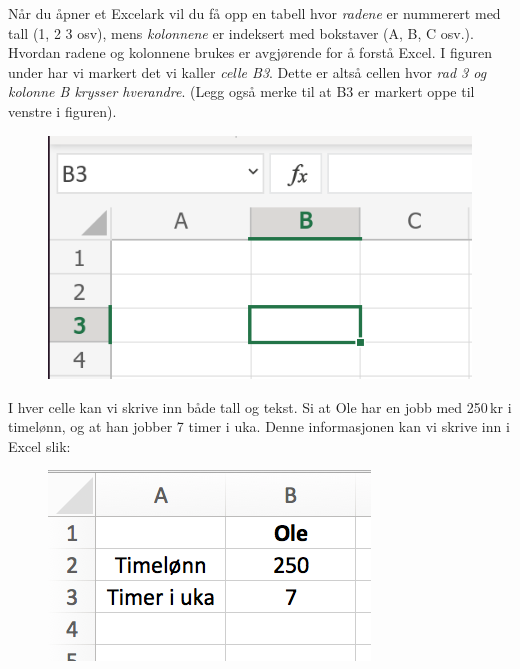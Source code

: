 




Når du åpner et Excelark vil du få opp en tabell hvor \textit{radene} er nummerert med tall (1, 2 3 osv), mens \textit{kolonnene} er indeksert med bokstaver (A, B, C osv.). Hvordan radene og kolonnene brukes er avgjørende for å forstå Excel. I figuren under har vi markert det vi kaller \textit{celle B\textsl{3}}. Dette er altså cellen hvor \textsl{rad 3 og kolonne B krysser hverandre}. (Legg også merke til at B3 er markert oppe til venstre i figuren).

\begin{figure}[H]
	\centering
	\includegraphics[scale=0.25]{figs/B3}
\end{figure}
I hver celle kan vi skrive inn både tall og tekst. Si at Ole har en jobb med 250\,kr i timelønn, og at han jobber 7 timer i uka. Denne informasjonen kan vi skrive inn i Excel slik:
\begin{figure}[H]
	\centering
	\includegraphics[scale=0.35]{figs/ex2}
\end{figure}
